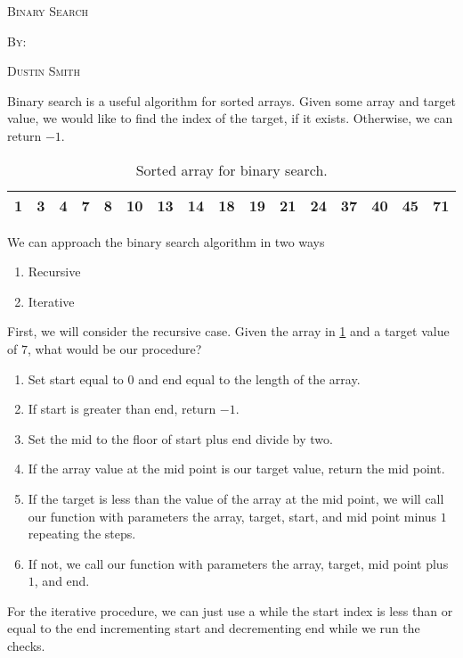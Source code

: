 \documentclass[12pt,dvipsnames,svgnames,x11names]{article}
\begin{document}
%
\pagecolor{gray!50}
\begin{center}
  \begin{center}
  \vspace*{\fill}
  \textsc{\LARGE Binary Search}
  \par\bigskip
  \textsc{By:}
  \par\bigskip
  \textsc{\LARGE Dustin Smith}
  \vspace*{\fill}
\end{center}
\end{center}

\newpage

Binary search is a useful algorithm for sorted arrays. Given some array and target value, we would like
to find the index of the target, if it exists. Otherwise, we can return \(-1\).
\begin{table}[h]
	\centering
	\begin{tabular}{| *{16}{|c|} |}
		 & 3 & 4 & 7 & 8 & 10 & 13 & 14 & 18 & 19 & 21 & 24 & 37 & 40 & 45 & 71\\
		\hline
	\end{tabular}
	\caption{Sorted array for binary search.}
	\label{binary_search}
\end{table}
We can approach the binary search algorithm in two ways
\begin{enumerate}
	\item Recursive
	\item Iterative
\end{enumerate}
First, we will consider the recursive case. Given the array in \cref{binary_search} and a target value
of \(7\), what would be our procedure?
\begin{enumerate}
	\item Set start equal to \(0\) and end equal to the length of the array.
	\item If start is greater than end, return \(-1\).
	\item Set the mid to the floor of start plus end divide by two.
	\item If the array value at the mid point is our target value, return the mid point.
	\item If the target is less than the value of the array at the mid point, we will call our  function
	with parameters the array, target, start, and mid point minus \(1\)  repeating the steps.
	\item If not, we call our function with parameters the array, target, mid point plus \(1\), and end.
\end{enumerate}
For the iterative procedure, we can just use a while the start index is less than or equal to the end
incrementing start and decrementing end while we run the checks.
\end{document}
